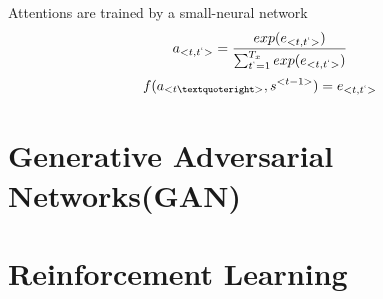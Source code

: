 \documentclass[11pt, openany]{book}              %
\begin{document}
Attentions are trained by a small-neural network 
$$a_{<t,t^`>} = \frac{exp(e_{<t,t^`>} ) }{\sum_{t^`=1}^{T_x} exp(e_{<t,t^`>}) }$$
$$f(a_{<t’>}, s^{<t-1>}  ) = e_{<t,t^`>}$$

\chapter{Generative Adversarial Networks(GAN)}
	
\chapter{Reinforcement Learning}
 
\end{document}
